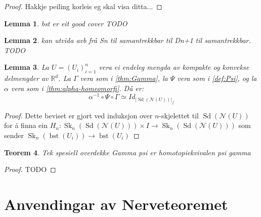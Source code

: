 \documentclass[a4paper, titlepage, 12pt, norsk]{article}
\theoremstyle{plain}
\newtheorem{theorem}{Teorem}[section]
\newtheorem{lemma}[theorem]{Lemma}
\theoremstyle{definition}
\newcommand{\Rb}{\mathbb{R}}
\newcommand{\Nc}{\mathcal{N}}
\newcommand{\gr}[1]{ \lvert #1 \rvert } %
\newcommand{\tuple}[1]{ \left( #1 \right) } %
\DeclareMathOperator{\Sd}{Sd}
\DeclareMathOperator{\bst}{bst}
\DeclareMathOperator{\Sk}{Sk}
\begin{document}
\begin{proof}
	Hakkje peiling korleis eg skal visa ditta...
\end{proof}

\begin{lemma}
	bst er eit good cover TODO
\end{lemma}

\begin{lemma}
	kan utvida avb frå Sn til samantrekkbar til Dn+1 til samantrekkbar. TODO
\end{lemma}

\begin{lemma} %
	La \( U = \tuple{U_i}_{i=1}^n \) vera ei endeleg mengda av kompakte og konvekse delmengder av \( \Rb^d \). La \( \Gamma \) vera som i \autoref{thm:Gamma}, la \( \Psi \) vera som i \autoref{def:Psi}, og la \( \alpha \) vera som i \autoref{thm:alpha-homeomorfi}. Då er:
	\[
		\alpha^{-1} \circ \Psi \circ \Gamma \simeq Id_{\gr{\Sd(\Nc(U))}_f}
	\]
\end{lemma}

\begin{proof}
	Dette beviset er gjort ved induksjon over \( n \)-skjelettet til \( \Sd(\Nc(U)) \) for å finna ein \( H_n : \Sk_n(\Sd(\Nc(U))) \times I \to \Sk_n(\Sd(\Nc(U))) \) som sender \( \Sk_n(\bst(U_i)) \to \bst(U_i) \)
\end{proof}



\begin{theorem} %
	Tek spesiell overdekke
	Gamma psi er homotopiekvivalen
	psi gamma
\end{theorem}

\begin{proof}
	TODO
\end{proof}

\section{Anvendingar av Nerveteoremet}
\end{document}
